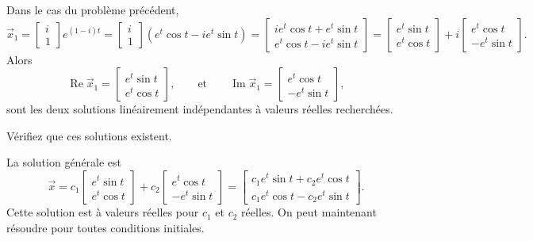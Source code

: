 Dans le cas du problème précédent,
\begin{equation*}
\vec{x}_1 =
\begin{bmatrix} i \\ 1 \end{bmatrix} e^{(1-i)t}
=
\begin{bmatrix} i \\ 1 \end{bmatrix} \left( e^t \cos t - i e^t \sin t \right)
=
\begin{bmatrix}
i e^t \cos t + e^t \sin t  \\
e^t \cos t - i e^t \sin t
\end{bmatrix}
=
\begin{bmatrix}
e^t \sin t  \\
e^t \cos t
\end{bmatrix}
+ i
\begin{bmatrix}
e^t \cos t  \\
- e^t \sin t
\end{bmatrix}
.
\end{equation*}
Alors
\begin{equation*}
\operatorname{Re} \vec{x}_1 = 
\begin{bmatrix}
e^t \sin t  \\
e^t \cos t
\end{bmatrix} ,
\qquad \text{et} \qquad
\operatorname{Im} \vec{x}_1 = 
\begin{bmatrix}
e^t \cos t \\
- e^t \sin t
\end{bmatrix} ,
\end{equation*}
sont les deux solutions linéairement indépendantes à valeurs réelles recherchées.

\begin{exercise}
Vérifiez que ces solutions existent.
\end{exercise}

La solution générale est
\begin{equation*}
\vec{x}
=
c_1
\begin{bmatrix}
e^t \sin t  \\
e^t \cos t
\end{bmatrix} 
+ c_2
\begin{bmatrix}
e^t \cos t \\
-e^t \sin t
\end{bmatrix} 
=
\begin{bmatrix}
c_1 e^t \sin t + c_2 e^t \cos t \\
c_1 e^t \cos t - c_2 e^t \sin t
\end{bmatrix} .
\end{equation*}
Cette solution est à valeurs réelles pour $c_1$ et $c_2$ réelles. On peut maintenant résoudre pour toutes conditions initiales.

